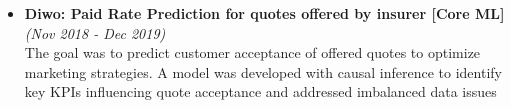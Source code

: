 \documentclass[a4paper,10pt]{article}
\newcommand{\isep}{-2 pt}
\begin{document}
\begin{itemize}
\item \textbf{Diwo: Paid Rate Prediction for quotes offered by insurer  [Core ML]}\hfill {\emph{(Nov 2018 - Dec 2019)}}\\
The goal was to predict customer acceptance of offered quotes to optimize marketing strategies. A model was developed with causal inference to identify key KPIs influencing quote acceptance and addressed imbalanced data issues
\\ [-0.5cm]


\end{itemize}
\end{document}
